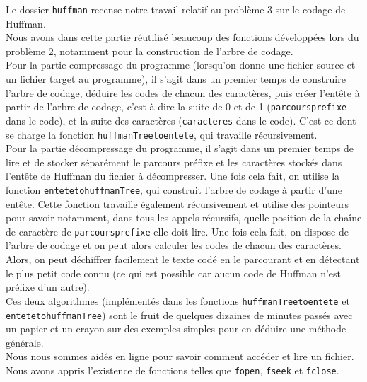 \documentclass[11pt]{article}
\begin{document}
\quad \quad Le dossier \texttt{huffman} recense notre travail relatif au problème 3 sur le codage de Huffman. \\

Nous avons dans cette partie réutilisé beaucoup des fonctions développées lors du problème 2, notamment pour la construction de l'arbre de codage. \\

Pour la partie compressage du programme (lorsqu'on donne une fichier source et un fichier target au programme), il s'agit dans un premier temps de construire l'arbre de codage, déduire les codes de chacun des caractères, puis créer l'entête à partir de l'arbre de codage, c'est-à-dire la suite de 0 et de 1 (\texttt{parcours\textunderscore prefixe} dans le code), et la suite des caractères (\texttt{caracteres} dans le code). C'est ce dont se charge la fonction \texttt{huffmanTree\textunderscore to\textunderscore entete}, qui travaille récursivement.\\

Pour la partie décompressage du programme, il s'agit dans un premier temps de lire et de stocker séparément le parcours préfixe et les caractères stockés dans l'entête de Huffman du fichier à décompresser. Une fois cela fait, on utilise la fonction \texttt{entete\textunderscore to\textunderscore huffmanTree}, qui construit l'arbre de codage à partir d'une entête. Cette fonction travaille également récursivement et utilise des pointeurs pour savoir notamment, dans tous les appels récursifs, quelle position de la chaîne de caractère de \texttt{parcours\textunderscore prefixe} elle doit lire. Une fois cela fait, on dispose de l'arbre de codage et on peut alors calculer les codes de chacun des caractères. Alors, on peut déchiffrer facilement le texte codé en le parcourant et en détectant le plus petit code connu (ce qui est possible car aucun code de Huffman n'est préfixe d'un autre). \\

Ces deux algorithmes (implémentés dans les fonctions \texttt{huffmanTree\textunderscore to\textunderscore entete} et \\ \texttt{entete\textunderscore to\textunderscore huffmanTree}) sont le fruit de quelques dizaines de minutes passés avec un papier et un crayon sur des exemples simples pour en déduire une méthode générale. \\

Nous nous sommes aidés en ligne pour savoir comment accéder et lire un fichier. Nous avons appris l'existence de fonctions telles que \texttt{fopen}, \texttt{fseek} et \texttt{fclose}. \\
\end{document}
